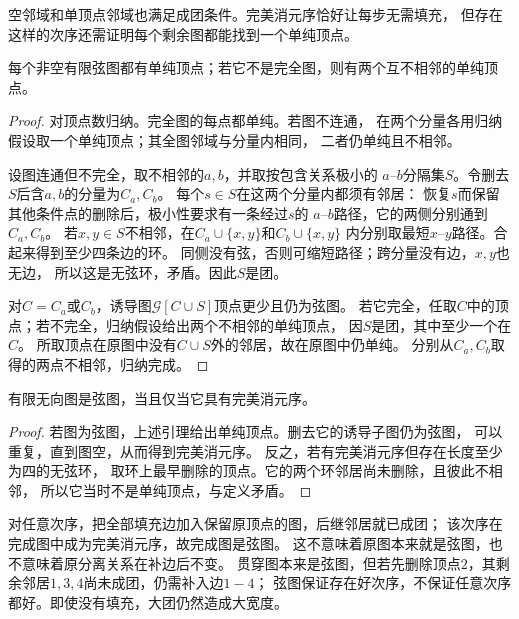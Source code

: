 空邻域和单顶点邻域也满足成团条件。完美消元序恰好让每步无需填充，
但存在这样的次序还需证明每个剩余图都能找到一个单纯顶点。

\begin{lemma}[弦图的单纯顶点]
  \label{lem:graph-theory-chordal-simplicial-vertex}
  每个非空有限弦图都有单纯顶点；若它不是完全图，则有两个互不相邻的单纯顶点。
\end{lemma}

\begin{proof}
对顶点数归纳。完全图的每点都单纯。若图不连通，
在两个分量各用归纳假设取一个单纯顶点；其全图邻域与分量内相同，
二者仍单纯且不相邻。

设图连通但不完全，取不相邻的\(a,b\)，并取按包含关系极小的
\(a\)--\(b\)分隔集\(S\)。令删去\(S\)后含\(a,b\)的分量为\(C_a,C_b\)。
每个\(s\in S\)在这两个分量内都须有邻居：
恢复\(s\)而保留其他条件点的删除后，极小性要求有一条经过\(s\)的
\(a\)--\(b\)路径，它的两侧分别通到\(C_a,C_b\)。
若\(x,y\in S\)不相邻，在\(C_a\cup\{x,y\}\)和\(C_b\cup\{x,y\}\)
内分别取最短\(x\)--\(y\)路径。合起来得到至少四条边的环。
同侧没有弦，否则可缩短路径；跨分量没有边，\(x,y\)也无边，
所以这是无弦环，矛盾。因此\(S\)是团。

对\(C=C_a\)或\(C_b\)，诱导图\(\mathcal G[C\cup S]\)顶点更少且仍为弦图。
若它完全，任取\(C\)中的顶点；若不完全，归纳假设给出两个不相邻的单纯顶点，
因\(S\)是团，其中至少一个在\(C\)。
所取顶点在原图中没有\(C\cup S\)外的邻居，故在原图中仍单纯。
分别从\(C_a,C_b\)取得的两点不相邻，归纳完成。
\end{proof}

\begin{theorem}[弦图与完美消元序]
  \label{thm:graph-theory-chordal-perfect-elimination}
  有限无向图是弦图，当且仅当它具有完美消元序。
\end{theorem}

\begin{proof}
若图为弦图，上述引理给出单纯顶点。删去它的诱导子图仍为弦图，
可以重复，直到图空，从而得到完美消元序。
反之，若有完美消元序但存在长度至少为四的无弦环，
取环上最早删除的顶点。它的两个环邻居尚未删除，且彼此不相邻，
所以它当时不是单纯顶点，与定义矛盾。
\end{proof}

对任意次序，把全部填充边加入保留原顶点的图，后继邻居就已成团；
该次序在完成图中成为完美消元序，故完成图是弦图。
这不意味着原图本来就是弦图，也不意味着原分离关系在补边后不变。
贯穿图本来是弦图，但若先删除顶点\(2\)，其剩余邻居\(1,3,4\)尚未成团，仍需补入边\(1-4\)；
弦图保证存在好次序，不保证任意次序都好。即使没有填充，大团仍然造成大宽度。

